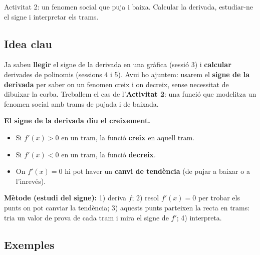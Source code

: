 %
{Activitat 2: un fenomen social que puja i baixa. Calcular la derivada, estudiar-ne el signe i interpretar els trams.}

\subsection{Idea clau}

Ja sabeu \textbf{llegir} el signe de la derivada en una gràfica (sessió 3) i
\textbf{calcular} derivades de polinomis (sessions 4 i 5). Avui ho ajuntem: usarem el
\textbf{signe de la derivada} per saber on un fenomen creix i on decreix, sense
necessitat de dibuixar la corba. Treballem el cas de l'\textbf{Activitat 2}: una funció
que modelitza un fenomen social amb trams de pujada i de baixada.

\begin{idea}
\textbf{El signe de la derivada diu el creixement.}
\begin{itemize}[leftmargin=1.4em, itemsep=2pt]
  \item Si $f'(x)>0$ en un tram, la funció \textbf{creix} en aquell tram.
  \item Si $f'(x)<0$ en un tram, la funció \textbf{decreix}.
  \item On $f'(x)=0$ hi pot haver un \textbf{canvi de tendència} (de pujar a baixar o
        a l'inrevés).
\end{itemize}
\textbf{Mètode (estudi del signe):} 1) deriva $f$; 2) resol $f'(x)=0$ per trobar els
punts on pot canviar la tendència; 3) aquests punts parteixen la recta en trams: tria
un valor de prova de cada tram i mira el signe de $f'$; 4) interpreta.
\end{idea}

\subsection{Exemples}

